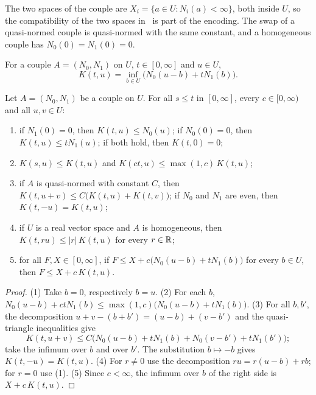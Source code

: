 The two spaces of the couple are $X_i = \{a \in U : N_i(a) < \infty\}$, both inside $U$, so the
compatibility of the two spaces in~\cite[Section~2.3]{BerghLofstrom} is part of the encoding.
The swap of a quasi-normed couple is quasi-normed with the same constant, and a homogeneous
couple has $N_0(0) = N_1(0) = 0$.

\begin{definition}
\label{def:couple-k-functional}
\leanok
{}
For a couple $A = (N_0, N_1)$ on $U$, $t \in [0, \infty]$ and $u \in U$,
\[
  K(t, u) = \inf_{b \in U} \bigl(N_0(u - b) + t N_1(b)\bigr) .
\]
\end{definition}

\begin{lemma}
\label{lem:couple-k-functional}
\leanok
{}
Let $A = (N_0, N_1)$ be a couple on $U$. For all $s \leq t$ in $[0, \infty]$, every
$c \in [0, \infty)$ and all $u, v \in U$:
\begin{enumerate}
  \item if $N_1(0) = 0$, then $K(t, u) \leq N_0(u)$; if $N_0(0) = 0$, then
    $K(t, u) \leq t N_1(u)$; if both hold, then $K(t, 0) = 0$;
  \item $K(s, u) \leq K(t, u)$ and $K(ct, u) \leq \max(1, c) \, K(t, u)$;
  \item if $A$ is quasi-normed with constant $C$, then
    $K(t, u + v) \leq C \bigl(K(t, u) + K(t, v)\bigr)$; if $N_0$ and $N_1$ are even, then
    $K(t, -u) = K(t, u)$;
  \item if $U$ is a real vector space and $A$ is homogeneous, then
    $K(t, r u) \leq |r| \, K(t, u)$ for every $r \in \mathbb{R}$;
  \item for all $F, X \in [0, \infty]$, if $F \leq X + c \bigl(N_0(u - b) + t N_1(b)\bigr)$ for
    every $b \in U$, then $F \leq X + c \, K(t, u)$.
\end{enumerate}
\end{lemma}

\begin{proof}
\leanok
(1) Take $b = 0$, respectively $b = u$. (2) For each $b$,
$N_0(u - b) + ct N_1(b) \leq \max(1, c) \bigl(N_0(u - b) + t N_1(b)\bigr)$. (3) For all $b, b'$,
the decomposition $u + v - (b + b') = (u - b) + (v - b')$ and the quasi-triangle inequalities
give
\[
  K(t, u + v) \leq C \bigl(N_0(u - b) + t N_1(b) + N_0(v - b') + t N_1(b')\bigr) ;
\]
take the infimum over $b$ and over $b'$. The substitution $b \mapsto -b$ gives
$K(t, -u) = K(t, u)$. (4) For $r \neq 0$ use the decomposition $r u = r(u - b) + r b$; for
$r = 0$ use (1). (5) Since $c < \infty$, the infimum over $b$ of the right side is
$X + c \, K(t, u)$.
\end{proof}

